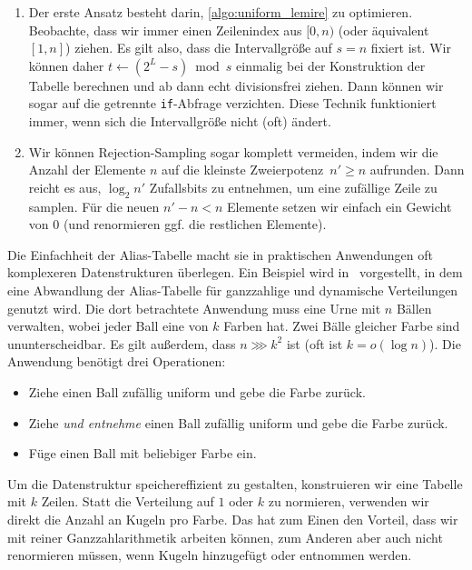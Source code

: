 \begin{enumerate}
    \item
          Der erste Ansatz besteht darin, \cref{algo:uniform_lemire} zu optimieren.
          Beobachte, dass wir immer einen Zeilenindex aus $[0, n)$ (oder äquivalent $[1, n]$) ziehen.
          Es gilt also, dass die Intervallgröße auf $s = n$ fixiert ist.
          Wir können daher $t \gets (2^L -s) \bmod s$ einmalig bei der Konstruktion der Tabelle berechnen und ab dann echt divisionsfrei ziehen.
          Dann können wir sogar auf die getrennte \texttt{if}-Abfrage verzichten.
          Diese Technik funktioniert immer, wenn sich die Intervallgröße nicht (oft) ändert.

    \item
          Wir können Rejection-Sampling sogar komplett vermeiden, indem wir die Anzahl der Elemente $n$ auf die kleinste Zweierpotenz~$n' \ge n$ aufrunden.
          Dann reicht es aus, $\log_2 n'$ Zufallsbits zu entnehmen, um eine zufällige Zeile zu samplen.
          Für die neuen $n' -n < n$ Elemente setzen wir einfach ein Gewicht von $0$ (und renormieren ggf. die restlichen Elemente).
\end{enumerate}

Die Einfachheit der Alias-Tabelle macht sie in praktischen Anwendungen oft komplexeren Datenstrukturen überlegen.
Ein Beispiel wird in~\cite{DBLP:conf/esa/BerenbrinkHK0PT20} vorgestellt, in dem eine Abwandlung der Alias-Tabelle für ganzzahlige und dynamische Verteilungen genutzt wird.
Die dort betrachtete Anwendung muss eine Urne mit $n$ Bällen verwalten, wobei jeder Ball eine von $k$ Farben hat.
Zwei Bälle gleicher Farbe sind ununterscheidbar.
Es gilt außerdem, dass $n \ggg k^2$ ist (oft ist $k = o(\log n)$).
Die Anwendung benötigt drei Operationen:
\begin{itemize}
    \item Ziehe einen Ball zufällig uniform und gebe die Farbe zurück.
    \item Ziehe \emph{und entnehme} einen Ball zufällig uniform und gebe die Farbe zurück.
    \item Füge einen Ball mit beliebiger Farbe ein.
\end{itemize}

Um die Datenstruktur speichereffizient zu gestalten, konstruieren wir eine Tabelle mit $k$ Zeilen.
Statt die Verteilung auf $1$ oder $k$ zu normieren, verwenden wir direkt die Anzahl an Kugeln pro Farbe.
Das hat zum Einen den Vorteil, dass wir mit reiner Ganzzahlarithmetik arbeiten können, zum Anderen aber auch nicht renormieren müssen, wenn Kugeln hinzugefügt oder entnommen werden.


